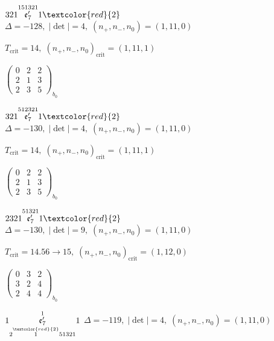 \documentclass[10pt]{article}
\begin{document}
\smallskip

$321\overset{151321}{\mathfrak{e}_7'}1\textcolor{red}{2}$ \quad $\Delta=-128,\; |\det|=4,\; (n_+,n_-,n_0)=(1,11,0)$

\hspace{1em}$T_{\text{crit}}=14,\; (n_+,n_-,n_0)_{\text{crit}}=(1,11,1)$

\hspace{2em}$\left(\begin{smallmatrix}0 & 2 & 2 \\ 2 & 1 & 3 \\ 2 & 3 & 5\end{smallmatrix}\right)_{\!b_0}$

\smallskip

$321\overset{512321}{\mathfrak{e}_7'}1\textcolor{red}{2}$ \quad $\Delta=-130,\; |\det|=4,\; (n_+,n_-,n_0)=(1,11,0)$

\hspace{1em}$T_{\text{crit}}=14,\; (n_+,n_-,n_0)_{\text{crit}}=(1,11,1)$

\hspace{2em}$\left(\begin{smallmatrix}0 & 2 & 2 \\ 2 & 1 & 3 \\ 2 & 3 & 5\end{smallmatrix}\right)_{\!b_0}$

\smallskip

$2321\overset{51321}{\mathfrak{e}_7'}1\textcolor{red}{2}$ \quad $\Delta=-130,\; |\det|=9,\; (n_+,n_-,n_0)=(1,11,0)$

\hspace{1em}$T_{\text{crit}}=14.56 \to 15,\; (n_+,n_-,n_0)_{\text{crit}}=(1,12,0)$

\hspace{2em}$\left(\begin{smallmatrix}0 & 3 & 2 \\ 3 & 2 & 4 \\ 2 & 4 & 4\end{smallmatrix}\right)_{\!b_0}$

\smallskip

$1\overset{1}{\underset{2\overset{\textcolor{red}{2}}{1}51321}{\mathfrak{e}_7'}}1$ \quad $\Delta=-119,\; |\det|=4,\; (n_+,n_-,n_0)=(1,11,0)$
\end{document}
